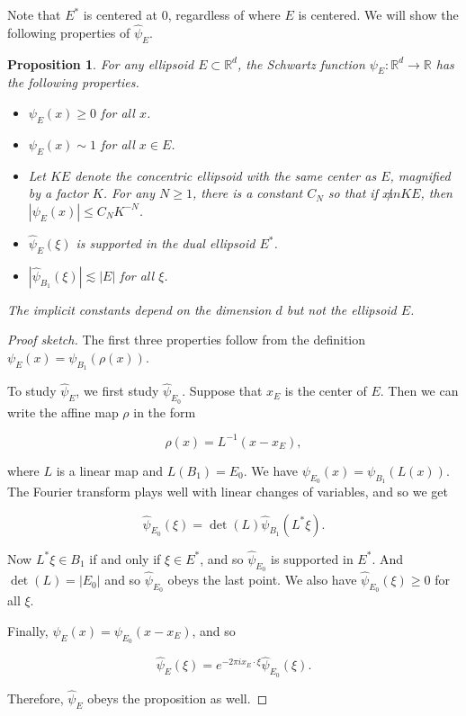 \documentclass{amsart}
\newtheorem{prop}[theorem]{Proposition}
\newcommand{\RR}{\mathbb{R}}
\begin{document}
Note that $E^*$ is centered at 0,  regardless of where $E$ is centered.   We will show the following properties of $\hat \psi_E$.  


\begin{prop} \label{propbumpE} For any ellipsoid $E \subset \RR^d$,  the Schwartz function $\psi_{E}: \RR^d \rightarrow \RR$ has the following properties.

\begin{itemize}

\item $\psi_{E}(x) \ge 0$ for all $x$.

\item $\psi_{E}(x) \sim 1$ for all $x \in E$.

\item Let $KE$ denote the concentric ellipsoid with the same center as $E$, magnified by a factor $K$.   For any $N \ge 1$,  there is a constant $C_N$ so that if $x \not in KE$,  then $|\psi_E(x)| \le C_N K^{-N}$.

\item $\hat \psi_{E}(\xi)$ is supported in the dual ellipsoid $E^*$.

\item $|\hat \psi_{B_1}(\xi)| \lesssim |E|$ for all $\xi$.  

\end{itemize}

The implicit constants depend on the dimension $d$ but not the ellipsoid $E$.

\end{prop}

\begin{proof} [Proof sketch]

The first three properties follow from the definition $\psi_E(x) = \psi_{B_1}(\rho(x))$.

To study $\hat \psi_E$,  we first study $\hat \psi_{E_0}$.   Suppose that $x_E$ is the center of $E$.   Then we can write the affine map $\rho$ in the form

$$\rho(x)= L^{-1} ( x- x_E), $$

\noindent where $L$ is a linear map and $L(B_1) = E_0$.    We have $\psi_{E_0}(x) = \psi_{B_1} ( L(x))$.   The Fourier transform plays well with linear changes of variables,  and so we get

$$ \hat \psi_{E_0}(\xi) = \det(L) \hat \psi_{B_1}( L^* \xi). $$

Now $L^* \xi \in B_1$ if and only if $\xi \in E^*$,  and so $\hat \psi_{E_0}$ is supported in $E^*$.   And $\det(L) = |E_0|$ and so $\hat \psi_{E_0}$ obeys the last point.   We also have $\hat \psi_{E_0}(\xi) \ge 0$ for all $\xi$.

Finally,  $\psi_E(x) = \psi_{E_0}(x - x_E)$,  and so

$$ \hat \psi_E(\xi) = e^{-2 \pi i x_E \cdot \xi} \hat \psi_{E_0}(\xi). $$

Therefore,  $\hat \psi_E$ obeys the proposition as well.

\end{proof}
\end{document}
